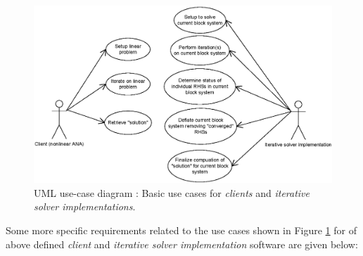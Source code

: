 \documentclass[pdf,ps2pdf,11pt]{SANDreport}
\begin{document}
{\bsinglespace
\begin{figure}[t]
\begin{center}
\includegraphics*[scale=0.85]{BelosUseCases}
\end{center}
\caption{
\label{belos:fig:BelosUseCases}
UML use-case diagram : Basic use cases
for {}\textit{clients} and {}\textit{iterative solver implementations}.}
\end{figure}
\esinglespace}

Some more specific requirements related to the use cases shown in
Figure {}\ref{belos:fig:BelosUseCases} for of above defined
{}\textit{client} and {}\textit{iterative solver implementation}
software are given below:
\end{document}
